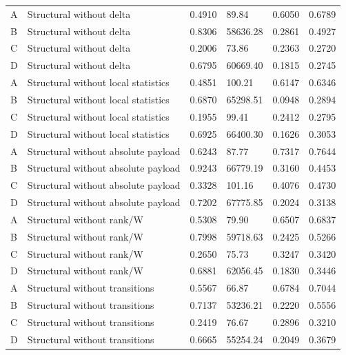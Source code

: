 \documentclass[12pt, a4paper, reqno, oneside]{book}
\begin{document}
{\begin{longtable}{P{1.1cm}P{4.9cm}P{1.6cm}P{2.2cm}P{1.6cm}P{1.6cm}}
A & Structural without delta & 0.4910 & 89.84 & 0.6050 & 0.6789\\
B & Structural without delta & 0.8306 & 58636.28 & 0.2861 & 0.4927\\
C & Structural without delta & 0.2006 & 73.86 & 0.2363 & 0.2720\\
D & Structural without delta & 0.6795 & 60669.40 & 0.1815 & 0.2745\\
A & Structural without local statistics & 0.4851 & 100.21 & 0.6147 & 0.6346\\
B & Structural without local statistics & 0.6870 & 65298.51 & 0.0948 & 0.2894\\
C & Structural without local statistics & 0.1955 & 99.41 & 0.2412 & 0.2795\\
D & Structural without local statistics & 0.6925 & 66400.30 & 0.1626 & 0.3053\\
A & Structural without absolute payload & 0.6243 & 87.77 & 0.7317 & 0.7644\\
B & Structural without absolute payload & 0.9243 & 66779.19 & 0.3160 & 0.4453\\
C & Structural without absolute payload & 0.3328 & 101.16 & 0.4076 & 0.4730\\
D & Structural without absolute payload & 0.7202 & 67775.85 & 0.2024 & 0.3138\\
A & Structural without rank/W & 0.5308 & 79.90 & 0.6507 & 0.6837\\
B & Structural without rank/W & 0.7998 & 59718.63 & 0.2425 & 0.5266\\
C & Structural without rank/W & 0.2650 & 75.73 & 0.3247 & 0.3420\\
D & Structural without rank/W & 0.6881 & 62056.45 & 0.1830 & 0.3446\\
A & Structural without transitions & 0.5567 & 66.87 & 0.6784 & 0.7044\\
B & Structural without transitions & 0.7137 & 53236.21 & 0.2220 & 0.5556\\
C & Structural without transitions & 0.2419 & 76.67 & 0.2896 & 0.3210\\
D & Structural without transitions & 0.6665 & 55254.24 & 0.2049 & 0.3679\\
\bottomrule\end{longtable}}
\end{document}
